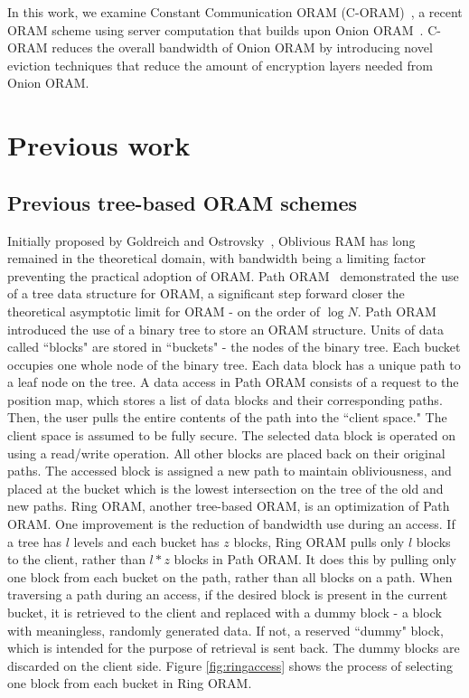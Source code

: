 \documentclass[12pt, oneside]{article}   	%
\begin{document}

In this work, we examine Constant Communication ORAM (C-ORAM)~\cite{C-ORAM}, a recent ORAM scheme using server computation that builds upon Onion ORAM~\cite{OnionORAM}. C-ORAM reduces the overall bandwidth of Onion ORAM by introducing novel eviction techniques that reduce the amount of encryption layers needed from Onion ORAM.



\section{Previous work}

\subsection{Previous tree-based ORAM schemes}
Initially proposed by Goldreich and Ostrovsky~\cite{TODO}, Oblivious RAM has long remained in the theoretical domain, with bandwidth being a limiting factor preventing the practical adoption of ORAM. Path ORAM~\cite{TODO} demonstrated the use of a tree data structure for ORAM, a significant step forward closer the theoretical asymptotic limit for ORAM - on the order of $\log N$. Path ORAM introduced the use of a binary tree to store an ORAM structure. Units of data called ``blocks" are stored in ``buckets" - the nodes of the binary tree. Each bucket occupies one whole node of the binary tree. Each data block has a unique path to a leaf node on the tree. A data access in Path ORAM consists of a request to the position map, which stores a list of data blocks and their corresponding paths. Then, the user pulls the entire contents of the path into the ``client space." The client space is assumed to be fully secure. The selected data block is operated on using a read/write operation. All other blocks are placed back on their original paths. The accessed block is assigned a new path to maintain obliviousness, and placed at the bucket which is the lowest intersection on the tree of the old and new paths. Ring ORAM, another tree-based ORAM, is an optimization of Path ORAM. One improvement is the reduction of bandwidth use during an access. If a tree has $l$ levels and each bucket has $z$ blocks, Ring ORAM pulls only $l$ blocks to the client, rather than $l*z$ blocks in Path ORAM. It does this by pulling only one block from each bucket on the path, rather than all blocks on a path. When traversing a path during an access, if the desired block is present in the current bucket, it is retrieved to the client and replaced with a dummy block - a block with meaningless, randomly generated data. If not, a reserved ``dummy" block, which is intended for the purpose of retrieval is sent back. The dummy blocks are discarded on the client side. Figure \ref{fig:ringaccess} shows the process of selecting one block from each bucket in Ring ORAM.
\end{document}
